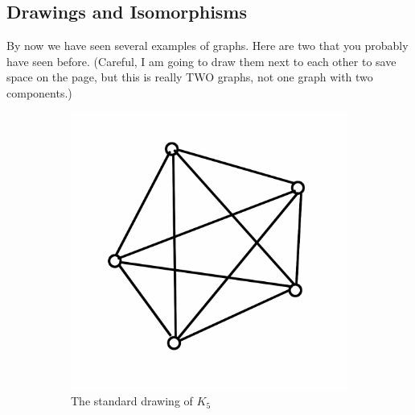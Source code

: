 \documentclass[12pt,letterpaper]{article}
\theoremstyle{definition}
\begin{document}
\subsection*{Drawings and Isomorphisms}

By now we have seen several examples of graphs. Here are two that you probably have seen before.
(Careful, I am going to draw them next to each other to save space on the page, but this is really TWO graphs,
not one graph with two components.)

\begin{figure}[h]
\centering
\begin{subfigure}[b]{0.4\textwidth}
\includegraphics[width=\textwidth]{images/k5.png}
\caption{The standard drawing of $K_5$}
\label{figure:stdK5}
\end{subfigure}
\begin{subfigure}[b]{0.4\textwidth}

\end{subfigure}
\end{figure}
\end{document}
